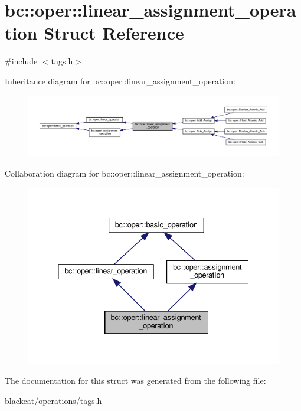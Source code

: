 \hypertarget{structbc_1_1oper_1_1linear__assignment__operation}{}\section{bc\+:\+:oper\+:\+:linear\+\_\+assignment\+\_\+operation Struct Reference}
\label{structbc_1_1oper_1_1linear__assignment__operation}


{\ttfamily \#include $<$tags.\+h$>$}



Inheritance diagram for bc\+:\+:oper\+:\+:linear\+\_\+assignment\+\_\+operation\+:\nopagebreak
\begin{figure}[H]
\begin{center}
\leavevmode
\includegraphics[width=350pt]{structbc_1_1oper_1_1linear__assignment__operation__inherit__graph}
\end{center}
\end{figure}


Collaboration diagram for bc\+:\+:oper\+:\+:linear\+\_\+assignment\+\_\+operation\+:\nopagebreak
\begin{figure}[H]
\begin{center}
\leavevmode
\includegraphics[width=332pt]{structbc_1_1oper_1_1linear__assignment__operation__coll__graph}
\end{center}
\end{figure}


The documentation for this struct was generated from the following file\+:\begin{DoxyCompactItemize}
\item 
blackcat/operations/\hyperlink{tags_8h}{tags.\+h}\end{DoxyCompactItemize}
